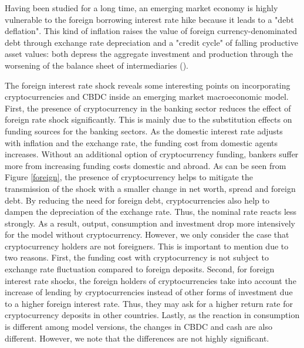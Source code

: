 \documentclass[12pt, a4paper]{article}
\begin{document}
Having been studied for a long time, an emerging market economy is highly vulnerable to the foreign borrowing interest rate hike because it leads to a "debt deflation". This kind of inflation raises the value of foreign currency-denominated debt through exchange rate depreciation and a "credit cycle" of falling productive asset values: both depress the aggregate investment and production through the worsening of the balance sheet of intermediaries (\cite{aoki2016monetary}).

The foreign interest rate shock reveals some interesting points on incorporating cryptocurrencies and CBDC inside an emerging market macroeconomic model. First, the presence of cryptocurrency in the banking sector reduces the effect of foreign rate shock significantly. This is mainly due to the substitution effects on funding sources for the banking sectors. As the domestic interest rate adjusts with inflation and the exchange rate, the funding cost from domestic agents increases. Without an additional option of cryptocurrency funding, bankers suffer more from increasing funding costs domestic and abroad. As can be seen from Figure \ref{foreign}, the presence of cryptocurrency helps to mitigate the transmission of the shock with a smaller change in net worth, spread and foreign debt. By reducing the need for foreign debt, cryptocurrencies also help to dampen the depreciation of the exchange rate. Thus, the nominal rate reacts less strongly. As a result, output, consumption and investment drop more intensively for the model without cryptocurrency. However, we only consider the case that cryptocurrency holders are not foreigners. This is important to mention due to two reasons. First, the funding cost with cryptocurrency is not subject to exchange rate fluctuation compared to foreign deposits. Second, for foreign interest rate shocks, the foreign holders of cryptocurrencies take into account the increase of lending by cryptocurrencies instead of other forms of investment due to a higher foreign interest rate. Thus, they may ask for a higher return rate for cryptocurrency deposits in other countries.  Lastly, as the reaction in consumption is different among model versions, the changes in CBDC and cash are also different. However, we note that the differences are not highly significant.
\end{document}

